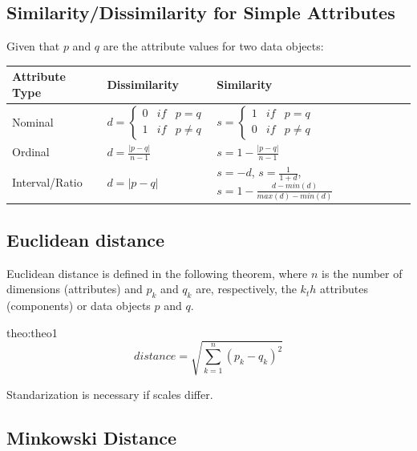 \subsection{Similarity/Dissimilarity for Simple Attributes}
Given that $p$ and $q$ are the attribute values for two data objects:
\begin{center}
    \begin{table}[H]
        \begin{tabular}{l|l|l}
            Attribute Type &
            Dissimilarity &
            Similarity \\ \hline \hline

            Nominal &
            $d = \left\{\begin{matrix} 0 & if & p=q\\  1 & if & p \neq q \end{matrix}\right.$ &
            $s = \left\{\begin{matrix} 1 & if & p=q\\  0 & if & p \neq q \end{matrix}\right.$ \\ \hline

            Ordinal &
            $d = \frac{|p-q|}{n-1}$&
            $s = 1 - \frac{|p-q|}{n-1}$ \\ \hline

            Interval/Ratio &
            $d = |p-q|$&
            $s = -d$, $s = \frac{1}{1+d}$, $s = 1- \frac{d- min(d)}{max(d)-min(d)}$
        \end{tabular}
    \end{table}
\end{center}

\subsection{Euclidean distance}

Euclidean distance is defined in the following theorem, where $n$ 
is the number of dimensions (attributes) and $p_k$ and $q_k$ are, respectively,
the $k_th$ attributes (components) or data objects $p$ and $q$.

\begin{theo}{theo:theo1}
\label{eq:euclidean-distance}
    \[
        distance = \sqrt{\sum_{k=1}^{n}(p_k-q_k)^2}
    \]
\end{theo}

Standarization is necessary if scales differ.


\subsection{Minkowski Distance}

